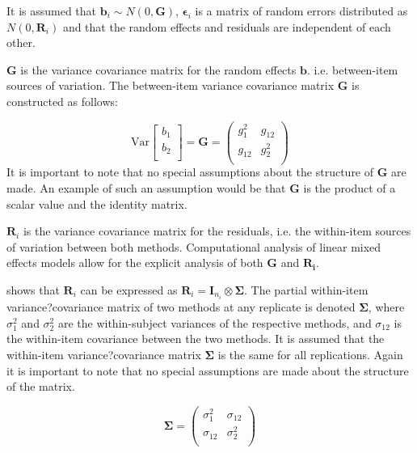 \documentclass[12pt, a4paper]{report}
\theoremstyle{plain}
\theoremstyle{definition}
\theoremstyle{remark}
\begin{document}
	It is assumed that $\boldsymbol{b}_i \sim N(0,\boldsymbol{G})$, $\boldsymbol{\epsilon}_i$ is a matrix of random errors distributed as $N(0,\boldsymbol{R}_i)$ and that the random effects and residuals are independent of each other.
	
	
	$\boldsymbol{G}$ is the variance covariance matrix for the random effects $\boldsymbol{b}$.
	i.e. between-item sources of variation. The between-item variance covariance matrix $\boldsymbol{G}$ is constructed as follows:
	
	\[ \mbox{Var}  \left[
	\begin{array}{c}
	b_1   \\
	b_2  \\
	\end{array}
	\right] =  \boldsymbol{G} =\left(
	\begin{array}{cc}
	g^2_1  & g_{12} \\
	g_{12} & g^2_2 \\
	\end{array}
	\right) \]
	It is important to note that no special assumptions about the structure of $\boldsymbol{G}$ are made. An example of such an assumption would be that $\boldsymbol{G}$ is the product of a scalar value and the identity matrix.
	
	$\boldsymbol{R}_{i}$ is the variance covariance matrix for the residuals, i.e. the within-item sources of variation between both methods. Computational analysis of linear mixed effects models allow for the explicit analysis of both $\boldsymbol{G}$ and $\boldsymbol{R_i}$.
	
	\citet{hamlett} shows that $\boldsymbol{R}_{i}$  can be expressed as $\boldsymbol{R}_{i} = \boldsymbol{I}_{n_{i}} \otimes \boldsymbol{\Sigma}$. The partial within-item variance?covariance matrix of two methods at any replicate is denoted $\boldsymbol{\Sigma}$, where $\sigma^2_{1}$ and $\sigma^2_{2}$ are the within-subject variances of the respective methods, and $\sigma_{12}$ is the within-item covariance between the two methods. It is assumed that the within-item variance?covariance matrix $\boldsymbol{\Sigma}$ is the same for all replications. Again it is important to note that no special assumptions are made about the structure of the matrix.
	
	\begin{equation}
	\boldsymbol{\Sigma} = \left( \begin{array}{cc}
	\sigma^2_{1} & \sigma_{12} \\
	\sigma_{12} & \sigma^2_{2} \\
	\end{array}\right)
	\end{equation}
	
\end{document}

